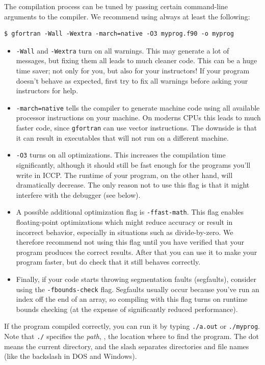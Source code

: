 \documentclass[openany,oneside]{report}
\begin{document}
The compilation process can be tuned by passing certain command-line arguments to the compiler.
We recommend using always at least the following:
\begin{verbatim}
$ gfortran -Wall -Wextra -march=native -O3 myprog.f90 -o myprog
\end{verbatim}
\begin{itemize}
  \item \texttt{-Wall} and \texttt{-Wextra} turn on all warnings.
    This may generate a lot of messages, but fixing them all leads to much cleaner code.
    This can be a huge time saver; not only for you, but also for your instructors!
    If your program doesn't behave as expected, first try to fix all warnings before asking your instructors for help.
  \item \texttt{-march=native} tells the compiler to generate machine code using all available processor instructions on your machine.
    On moderns CPUs this leads to much faster code, since \texttt{gfortran} can use vector instructions.
    The downside is that it can result in executables that will not run on a different machine.
  \item \texttt{-O3} turns on all optimizations.
    This increases the compilation time significantly, although it should still be fast enough for the programs you'll write in ICCP.
    The runtime of your program, on the other hand, will dramatically decrease.
    The only reason not to use this flag is that it might interfere with the debugger (see below).
  \item A possible additional optimization flag is \texttt{-ffast-math}.
    This flag enables floating-point optimizations which might reduce accuracy or result in incorrect behavior, especially in situations such as divide-by-zero.
    We therefore recommend not using this flag until you have verified that your program produces the correct results.
    After that you can use it to make your program faster, but do check that it still behaves correctly.
  \item Finally, if your code starts throwing segmentation faults (segfaults), consider using the \texttt{-fbounds-check} flag.
    Segfaults usually occur because you've run an index off the end of an array, so compiling with this flag turns on runtime bounds checking (at the expense of significantly reduced performance).
\end{itemize}
If the program compiled correctly, you can run it by typing \texttt{./a.out} or \texttt{./myprog}.
Note that \texttt{./} specifies the \emph{path}, \ie, the location where to find the program.
The dot means the current directory, and the slash separates directories and file names (like the backslash in DOS and Windows).
\end{document}
